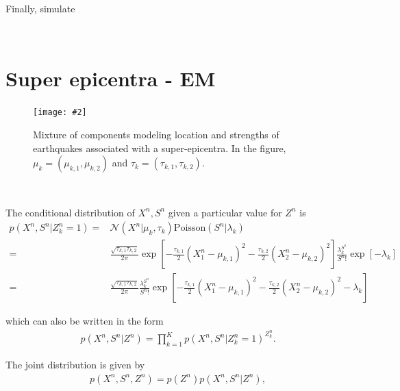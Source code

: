 \documentclass[11pt]{extarticle}
\newcommand{\N}{\mathcal{N}}
\newcommand{\0}{\mathbf{0}}
\renewcommand{\(}{\left(}
\renewcommand{\)}{\right)}
\theoremstyle{definition}
\newcommand{\image}[3]{
	\begin{figure}[!ht]
		\centering
	    \texttt{[image: \#2]}
		\caption{#3}
		\label{fig:#2}
	\end{figure}
}
\begin{document}
\par Finally, simulate 

\noindent{} \\
\par 


\section{Super epicentra - EM}
\image{0.5}{Q2_2}{Mixture of components modeling location and strengths of earthquakes associated with a super-epicentra. In the figure, $\mu_{k} = (\mu_{k,1}, \mu_{k,2})$ and $\tau_{k} = (\tau_{k,1}, \tau_{k,2})$.}
\noindent{} \\
\par The conditional distribution of $X^{n}, S^{n}$ given a particular value for $Z^{n}$ is
\begin{align*}
	p(X^{n}, S^{n} \vert Z^{n}_{k}=1) =& \N(X^{n} \vert \mu_{k}, \tau_{k}) \mathrm{Poisson}(S^{n} \vert \lambda_{k}) \\ 
	=& \frac{\sqrt{\tau_{k,1}\tau_{k,2}}}{2\pi} \exp\left[-\frac{\tau_{k,1}}{2}(X^{n}_{1} - \mu_{k,1})^{2} - \frac{\tau_{k,2}}{2}(X^{n}_{2} - \mu_{k,2})^{2}\right] \frac{\lambda_{k}^{S^{n}}}{S^{n}!} \exp\left[-\lambda_{k}\right] \\
	=& \frac{\sqrt{\tau_{k,1}\tau_{k,2}}}{2\pi} \frac{\lambda_{k}^{S^{n}}}{S^{n}!} \exp\left[-\frac{\tau_{k,1}}{2}(X^{n}_{1} - \mu_{k,1})^{2} - \frac{\tau_{k,2}}{2}(X^{n}_{2} - \mu_{k,2})^{2} -\lambda_{k}\right]
\end{align*}
\par which can also be written in the form
\begin{align*}
	p(X^{n}, S^{n} \vert Z^{n}) = \prod_{k=1}^{K} p(X^{n}, S^{n} \vert Z^{n}_{k}=1)^{Z^{n}_{k}}.
\end{align*}
\par The joint distribution is given by
\begin{align*}
	p(X^{n}, S^{n}, Z^{n}) = p(Z^{n}) p(X^{n}, S^{n} \vert Z^{n}),
\end{align*}
\end{document}
